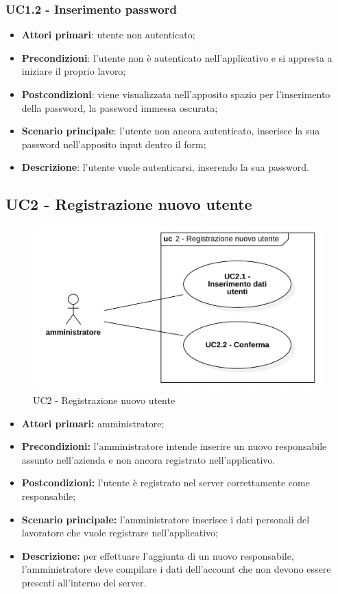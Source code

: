 \subsubsection{UC1.2 - Inserimento password}
\begin{itemize}
\item \textbf{Attori primari}: utente non autenticato;
\item \textbf{Precondizioni}: l'utente non è autenticato nell'applicativo e si appresta a iniziare il proprio lavoro;
\item \textbf{Postcondizioni}: viene visualizzata nell'apposito spazio per l'inserimento della password, la password immessa oscurata;
\item \textbf{Scenario principale}: l'utente non ancora autenticato, inserisce la sua password nell'apposito input dentro il form;
\item \textbf{Descrizione}: l'utente vuole autenticarsi, inserendo la sua password.
\end{itemize}

\subsection{UC2 - Registrazione nuovo utente}

\begin{figure}[H]
	\centering
	\includegraphics[scale=0.55]{res/images/uc2.png}
	\caption{UC2 - Registrazione nuovo utente}
\end{figure}
\begin{itemize}
	\item 	\textbf{Attori primari:} amministratore;
	\item 	\textbf{Precondizioni:}	l'amministratore intende inserire un nuovo responsabile assunto nell'azienda e non ancora registrato nell'applicativo.
	\item 	\textbf{Postcondizioni:} l'utente è registrato nel server correttamente come responsabile;
	\item 	\textbf{Scenario principale:} l'amministratore inserisce i dati personali del lavoratore che vuole registrare nell'applicativo;
	\item 	\textbf{Descrizione:} per effettuare l'aggiunta di un nuovo responsabile, l'amministratore deve compilare i dati dell'account che non devono essere presenti all'interno del server.

\end{itemize}

